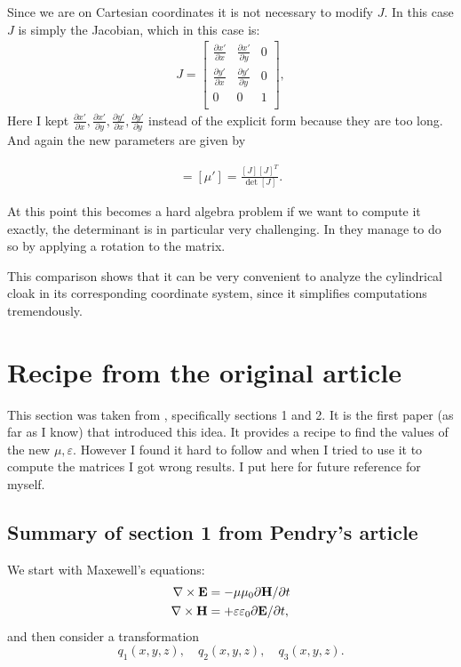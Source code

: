\documentclass{amsart}
\begin{document}
Since we are on Cartesian coordinates it is not necessary to modify \(J\).
In this case \(J\) is simply the Jacobian, which in this case is:
\begin{align}
  J=
  \begin{bmatrix}
  \frac{\partial x'}{\partial x} & \frac{\partial x'}{\partial y} & 0 \\
  \frac{\partial y'}{\partial x} & \frac{\partial y'}{\partial y} & 0 \\
  0 & 0 & 1\\
  \end{bmatrix},
\end{align}
Here I kept \(\frac{\partial x'}{\partial x},\frac{\partial x'}{\partial y},\frac{\partial y'}{\partial x},\frac{\partial y'}{\partial y}\) instead of the
explicit form because they are too long. And again the new parameters are given by

\begin{align*}
  [\varepsilon'] =[\mu']= \frac{[J][J]^T}{\det[J]}.
\end{align*}

At this point this becomes a hard algebra problem if we want to compute it exactly, the determinant
is in particular very challenging. In \cite{Schurig06_ray} they manage to
do so by applying a rotation to the matrix.

This comparison shows that it can be very convenient to analyze the cylindrical cloak in its
corresponding coordinate system, since it simplifies computations tremendously.


\appendix \section{Recipe from the original article}
This section was taken from \cite{ward96}, specifically sections 1 and 2.
It is the first paper (as far as I know) that introduced this idea.
It provides a recipe to find the values of the new \(\mu,\varepsilon\).
However I found it hard to follow and when I tried to use it to compute the matrices I got wrong results.
I put here for future reference for myself.

\subsection{Summary of section 1 from Pendry's article}
We start with Maxewell's equations:
\begin{align*}
  \nabla \times \textbf{E} &= -\mu \mu_0 \partial \textbf{H} /\partial t\\
  \nabla \times \textbf{H} &= +\varepsilon \varepsilon_0 \partial \textbf{E} /\partial t,
\end{align*}
and then consider a transformation
\[
q_1(x,y,z), \quad q_2(x,y,z), \quad q_3(x,y,z).
\]
\end{document}
